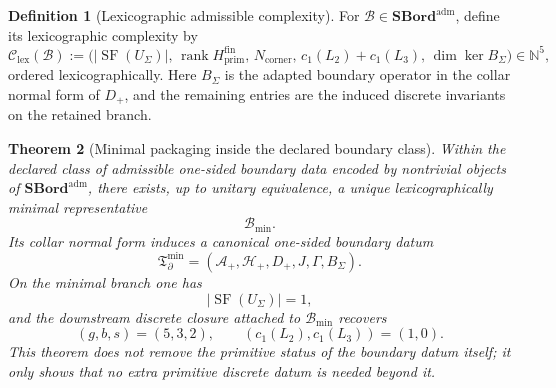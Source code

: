 \documentclass[11pt,a4paper]{article}
\newtheorem{theorem}{Theorem}[section]
\theoremstyle{definition}
\newtheorem{definition}[theorem]{Definition}
\theoremstyle{remark}
\DeclareMathOperator{\rank}{rank}
\DeclareMathOperator{\SF}{SF}
\newcommand{\Tbound}{\mathfrak T_{\partial}^{\min}}
\begin{document}
\begin{definition}[Lexicographic admissible complexity]
\label{def:lexicographic-admissible-complexity}
For $\mathcal B\in\mathbf{SBord}^{\mathrm{adm}}$, define its lexicographic complexity by
\[
\mathcal C_{\mathrm{lex}}(\mathcal B)
:=
\bigl(
|\SF(U_\Sigma)|,\,
\rank H_{\mathrm{prim}}^{\mathrm{fin}},\,
N_{\mathrm{corner}},\,
c_1(L_2)+c_1(L_3),\,
\dim\ker B_\Sigma
\bigr)\in\mathbb N^5,
\]
ordered lexicographically. Here $B_\Sigma$ is the adapted boundary operator in the collar normal
form of $D_+$, and the remaining entries are the induced discrete invariants on the retained branch.
\end{definition}

\begin{theorem}[Minimal packaging inside the declared boundary class]
\label{thm:initial-admissible-bordism}
Within the declared class of admissible one-sided boundary data encoded by nontrivial objects of
$\mathbf{SBord}^{\mathrm{adm}}$, there exists, up to unitary equivalence, a unique lexicographically
minimal representative
\[
\mathcal B_{\min}.
\]
Its collar normal form induces a canonical one-sided boundary datum
\[
\Tbound=(\mathcal A_+,\mathcal H_+,D_+,J,\Gamma,B_\Sigma).
\]
On the minimal branch one has
\[
|\SF(U_\Sigma)|=1,
\]
and the downstream discrete closure attached to $\mathcal B_{\min}$ recovers
\[
(g,b,s)=(5,3,2),
\qquad
(c_1(L_2),c_1(L_3))=(1,0).
\]
This theorem does not remove the primitive status of the boundary datum itself; it only shows that
no extra primitive discrete datum is needed beyond it.
\end{theorem}
\end{document}
